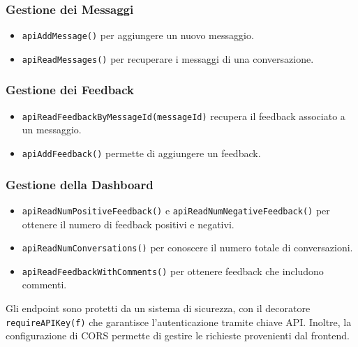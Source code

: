 \subsubsection*{Gestione dei Messaggi}
\begin{itemize}
    \item \texttt{apiAddMessage()} per aggiungere un nuovo messaggio.
    \item \texttt{apiReadMessages()} per recuperare i messaggi di una conversazione.
\end{itemize}

\subsubsection*{Gestione dei Feedback}
\begin{itemize}
    \item \texttt{apiReadFeedbackByMessageId(messageId)} recupera il feedback associato a un messaggio.
    \item \texttt{apiAddFeedback()} permette di aggiungere un feedback.
\end{itemize}

\subsubsection*{Gestione della Dashboard}
\begin{itemize}
    \item \texttt{apiReadNumPositiveFeedback()} e \texttt{apiReadNumNegativeFeedback()} per ottenere il numero di feedback positivi e negativi.
    \item \texttt{apiReadNumConversations()} per conoscere il numero totale di conversazioni.
    \item \texttt{apiReadFeedbackWithComments()} per ottenere feedback che includono commenti.
\end{itemize}

Gli endpoint sono protetti da un sistema di sicurezza, con il decoratore \texttt{requireAPIKey(f)} che garantisce l’autenticazione tramite chiave API. Inoltre, la configurazione di CORS permette di gestire le richieste provenienti dal frontend.

